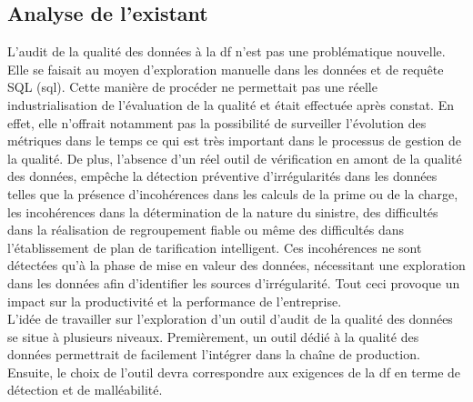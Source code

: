 \subsection{Analyse de l'existant}

L'audit de la qualit\'e des donn\'ees \`a la \acrlong{df} n'est pas une probl\'ematique nouvelle. Elle se faisait au moyen d'exploration manuelle dans les donn\'ees et de requ\^ete SQL (\acrlong{sql}). Cette mani\`ere de proc\'eder ne permettait pas une r\'eelle industrialisation de l'\'evaluation de la qualit\'e et \'etait effectu\'ee apr\`es constat. En effet, elle n'offrait notamment pas la possibilit\'e de surveiller l'\'evolution des m\'etriques dans le temps ce qui est tr\`es important dans le processus de gestion de la qualit\'e. De plus, l'absence d'un r\'eel outil de v\'erification en amont de la qualit\'e des donn\'ees, emp\^eche la d\'etection pr\'eventive d'irr\'egularit\'es dans les donn\'ees telles que la pr\'esence d'incoh\'erences dans les calculs de la prime ou de la charge, les incoh\'erences dans la détermination de la nature du sinistre, des difficult\'es dans la r\'ealisation de regroupement fiable ou m\^eme des difficult\'es dans l'\'etablissement de plan de tarification intelligent. Ces incoh\'erences ne sont d\'etect\'ees qu'\`a la phase de mise en valeur des donn\'ees, n\'ecessitant une exploration dans les donn\'ees afin d'identifier les sources d'irr\'egularit\'e. Tout ceci provoque un impact sur la productivit\'e et la performance de l'entreprise. \\

L’idée de travailler sur l'exploration d'un outil d'audit de la qualit\'e des donn\'ees se situe \`a plusieurs niveaux. Premièrement, un outil d\'edi\'e \`a la qualit\'e des donn\'ees permettrait de facilement l'int\'egrer dans la chaîne de production. Ensuite, le choix de l'outil devra correspondre aux exigences de la \acrshort{df} en terme de d\'etection et de mall\'eabilit\'e.  

